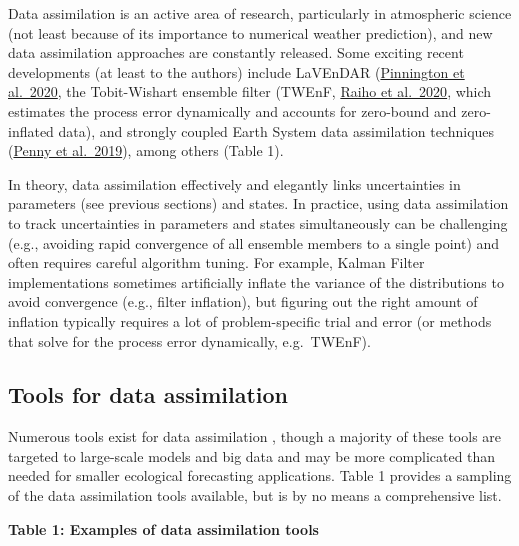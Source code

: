 \documentclass[
]{book}
\begin{document}
\begin{itemize}
  Data assimilation is an active area of research, particularly in atmospheric science (not least because of its importance to numerical weather prediction), and new data assimilation approaches are constantly released. Some exciting recent developments (at least to the authors) include LaVEnDAR (\href{https://doi.org/10.5194/gmd-13-55-20200,\%20which\%20implements\%20an\%20ensemble\%20approach\%20to\%204DVar}{Pinnington et al.~2020}, the Tobit-Wishart ensemble filter (TWEnF, \href{https://www.biorxiv.org/content/10.1101/2020.05.05.079871v10}{Raiho et al.~2020}, which estimates the process error dynamically and accounts for zero-bound and zero-inflated data), and strongly coupled Earth System data assimilation techniques (\href{https://agupubs.onlinelibrary.wiley.com/doi/full/10.1029/2019MS001652}{Penny et al.~2019}), among others (Table 1).
\end{itemize}

In theory, data assimilation effectively and elegantly links uncertainties in parameters (see previous sections) and states. In practice, using data assimilation to track uncertainties in parameters and states simultaneously can be challenging (e.g., avoiding rapid convergence of all ensemble members to a single point) and often requires careful algorithm tuning. For example, Kalman Filter implementations sometimes artificially inflate the variance of the distributions to avoid convergence (e.g., filter inflation), but figuring out the right amount of inflation typically requires a lot of problem-specific trial and error (or methods that solve for the process error dynamically, e.g.~TWEnF).

\hypertarget{tools-for-data-assimilation}{%
\subsection{Tools for data assimilation}\label{tools-for-data-assimilation}}

Numerous tools exist for data assimilation , though a majority of these tools are targeted to large-scale models and big data and may be more complicated than needed for smaller ecological forecasting applications. Table 1 provides a sampling of the data assimilation tools available, but is by no means a comprehensive list.

\textbf{Table 1: Examples of data assimilation tools}
\end{document}
